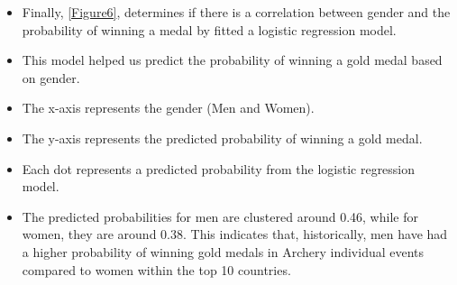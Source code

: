 \documentclass[
  12pt,
]{elsarticle}
\begin{document}
\begin{itemize}
\item
  Finally, \ref{Figure6}, determines if there is a correlation between
  gender and the probability of winning a medal by fitted a logistic
  regression model.
\item
  This model helped us predict the probability of winning a gold medal
  based on gender.
\item
  The x-axis represents the gender (Men and Women).
\item
  The y-axis represents the predicted probability of winning a gold
  medal.
\item
  Each dot represents a predicted probability from the logistic
  regression model.
\item
  The predicted probabilities for men are clustered around 0.46, while
  for women, they are around 0.38. This indicates that, historically,
  men have had a higher probability of winning gold medals in Archery
  individual events compared to women within the top 10 countries.
\end{itemize}
\end{document}
